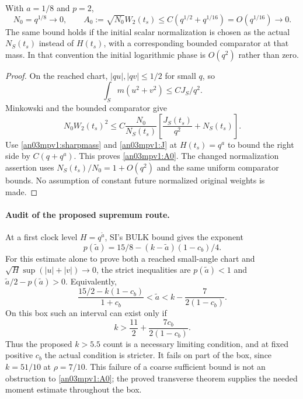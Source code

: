 \documentclass[11pt]{article}
\numberwithin{equation}{section}
\theoremstyle{remark}\newtheorem{remark}[theorem]{Remark}
\begin{document}
\begin{proposition}
\label{an03mpv1:smallness}
With $a=1/8$ and $p=2$,
\begin{equation}
 N_0=q^{1/8}\longrightarrow0,\qquad
 A_0:=\sqrt{N_0}W_2(t_s)
 \le C(q^{1/2}+q^{1/16})=O(q^{1/16})\longrightarrow0.
 \label{an03mpv1:A0}
\end{equation}
The same bound holds if the initial scalar normalization is chosen
as the actual $N_S(t_s)$ instead of $H(t_s)$, with a corresponding
bounded comparator at that mass. In that convention the initial
logarithmic phase is $O(q^2)$ rather than zero.
\end{proposition}
\begin{proof}
On the reached chart, $|qu|,|qv|\le1/2$ for small $q$, so
\[
 \int_S m(u^2+v^2)\le C J_S/q^2.
\]
Minkowski and the bounded comparator give
\[
 N_0W_2(t_s)^2\le C\frac{N_0}{N_S(t_s)}
             \left[\frac{J_S(t_s)}{q^2}+N_S(t_s)\right].
\]
Use \eqref{an03mpv1:sharpmass} and \eqref{an03mpv1:J} at
$H(t_s)=q^a$ to bound the right side by $C(q+q^a)$.
This proves \eqref{an03mpv1:A0}. The changed normalization assertion
uses $N_S(t_s)/N_0=1+O(q^2)$ and the same uniform comparator bounds.
No assumption of constant future normalized original weights is made.
\end{proof}

\paragraph{Audit of the proposed supremum route.}
At a first clock level $H=q^{\widetilde a}$, SI's BULK bound gives
the exponent
\[
 p(\widetilde a)=15/8-(k-\widetilde a)(1-c_b)/4.
\]
For this estimate alone to prove both a reached small-angle chart
and $\sqrt{H}\sup(|u|+|v|)\to0$, the strict inequalities are
$p(\widetilde a)<1$ and $\widetilde a/2-p(\widetilde a)>0$.
Equivalently,
\begin{equation}
 \frac{15/2-k(1-c_b)}{1+c_b}<\widetilde a
       <k-\frac{7}{2(1-c_b)}.
 \label{an03mpv1:supinterval}
\end{equation}
On this box such an interval can exist only if
\begin{equation}
 k>\frac{11}{2}+\frac{7c_b}{2(1-c_b)}.
 \label{an03mpv1:supthreshold}
\end{equation}
Thus the proposed $k>5.5$ count is a necessary limiting condition,
and at fixed positive $c_b$ the actual condition is stricter.
It fails on part of the box, since $k=51/10$ at $\rho=7/10$.
This failure of a coarse sufficient bound is not an obstruction to
\eqref{an03mpv1:A0}; the proved transverse theorem supplies the
needed moment estimate throughout the box.
\end{document}
